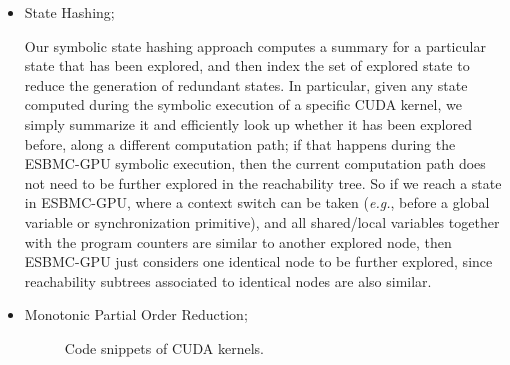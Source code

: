 \documentclass{llncs}
\begin{document}
\begin{enumerate}
\begin{itemize}
\begin{itemize}
		
	\item State Hashing; 
	
	Our symbolic state hashing approach computes a summary for a particular state that has been explored, and then index the set of explored state to reduce the generation of redundant states. In particular, given any state computed during the symbolic execution of a specific CUDA kernel, we simply summarize it and efficiently look up whether it has been explored before, along a different computation path; if that happens during the ESBMC-GPU symbolic execution, then the current computation path does not need to be further explored in the reachability tree. So if we reach a state in ESBMC-GPU, where a context switch can be taken ({\it e.g.}, before a global variable or synchronization primitive), and all shared/local variables together with the program counters are similar to another explored node, then ESBMC-GPU just considers one identical node to be further explored, since reachability subtrees associated to identical nodes are also similar. \\

	\item Monotonic Partial Order Reduction;
	
		\begin{figure}[!]
			\begin{center}
    			\hfill
    			\caption{Code snippets of CUDA kernels.}
    			\label{figure:demo-mpor-codes}
		\end{center}
  		\end{figure}
		

\end{itemize}
\end{itemize}
\end{enumerate}
\end{document}
